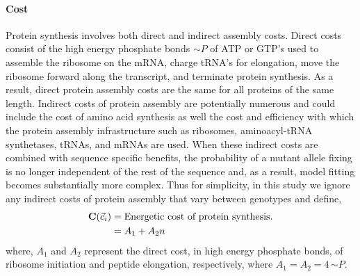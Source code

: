 \documentclass{article}
\newcommand{\Costcveci}{\ensuremath{\Cost(\cveci)}\xspace}
\newcommand{\Cost}{\ensuremath{\text{\textbf{C}}}\xspace}
\newcommand{\simP}{\ensuremath{\sim P}\xspace}
\newcommand{\cveci}{\ensuremath{\cvec_i}\xspace}
\newcommand{\cvec}{\ensuremath{\Vec{c}}\xspace}
\begin{document}
\paragraph*{Cost}
Protein synthesis involves both direct and indirect assembly costs.
Direct costs consist of the high energy phosphate bonds \simP of ATP or GTP's used to assemble the ribosome on the mRNA, charge tRNA's for elongation, move the ribosome forward along the transcript, and terminate protein synthesis.
As a result, direct protein assembly costs are the same for all proteins of the same length.
Indirect costs of protein assembly are potentially numerous and could include the cost of amino acid synthesis as well the cost and efficiency with which the protein assembly infrastructure such as ribosomes, aminoacyl-tRNA synthetases, tRNAs, and mRNAs are used.
When these indirect costs are combined with sequence specific benefits, the probability of a mutant allele fixing is no longer independent of the rest of the sequence \citep{GilchristEtAl2015} and, as a result, model fitting becomes substantially more complex.
Thus for simplicity, in this study we ignore any indirect costs of protein assembly that vary between genotypes and define,
\begin{align}
\label{eq:defineCost}
  \Costcveci  &= \text{Energetic cost of protein synthesis.}\\
  &= A_1 + A_2 n
\end{align}
where, $A_1$ and $A_2$ represent the direct cost, in high energy phosphate bonds, of ribosome initiation and peptide elongation, respectively, where $A_1 = A_2 = 4  \, \simP$.
\end{document}
